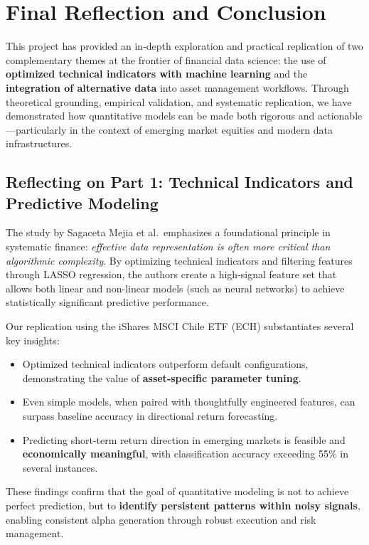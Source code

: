 \section{Final Reflection and Conclusion}

This project has provided an in-depth exploration and practical replication of two complementary themes at the frontier of financial data science: the use of \textbf{optimized technical indicators with machine learning} and the \textbf{integration of alternative data} into asset management workflows. Through theoretical grounding, empirical validation, and systematic replication, we have demonstrated how quantitative models can be made both rigorous and actionable—particularly in the context of emerging market equities and modern data infrastructures.

\subsection{Reflecting on Part 1: Technical Indicators and Predictive Modeling}

The study by Sagaceta Mejia et al.\ emphasizes a foundational principle in systematic finance: \textit{effective data representation is often more critical than algorithmic complexity}. By optimizing technical indicators and filtering features through LASSO regression, the authors create a high-signal feature set that allows both linear and non-linear models (such as neural networks) to achieve statistically significant predictive performance.

Our replication using the iShares MSCI Chile ETF (ECH) substantiates several key insights:

\begin{itemize}
    \item Optimized technical indicators outperform default configurations, demonstrating the value of \textbf{asset-specific parameter tuning}.
    \item Even simple models, when paired with thoughtfully engineered features, can surpass baseline accuracy in directional return forecasting.
    \item Predicting short-term return direction in emerging markets is feasible and \textbf{economically meaningful}, with classification accuracy exceeding 55\% in several instances.
\end{itemize}

These findings confirm that the goal of quantitative modeling is not to achieve perfect prediction, but to \textbf{identify persistent patterns within noisy signals}, enabling consistent alpha generation through robust execution and risk management.


